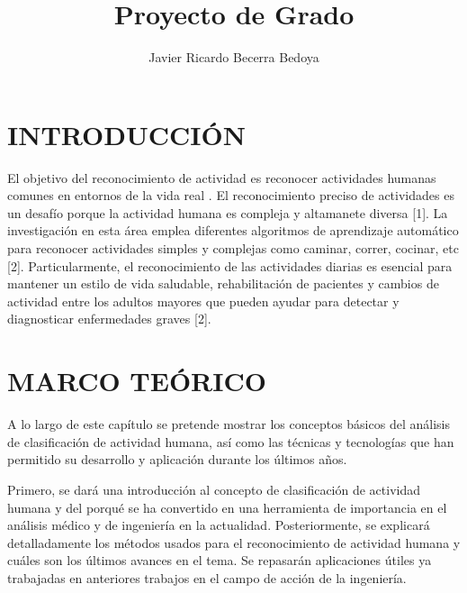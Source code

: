 \documentclass[11pt]{report} %
\title{Proyecto de Grado}
\author{Javier Ricardo Becerra Bedoya}
\begin{document}
\maketitle

\chapter{INTRODUCCIÓN}
El objetivo del reconocimiento de actividad es reconocer actividades humanas comunes en entornos de la vida real \cite{kimHAR}. El reconocimiento preciso de actividades es un desafío porque la actividad humana es compleja y altamanete diversa [1]. La investigación en esta área emplea diferentes algoritmos de aprendizaje automático para reconocer actividades simples y complejas como caminar, correr, cocinar, etc [2]. Particularmente, el reconocimiento de las actividades diarias es esencial para mantener un estilo de vida saludable, rehabilitación de pacientes y cambios de actividad entre los adultos mayores que pueden ayudar para detectar y diagnosticar enfermedades graves [2].
\chapter{MARCO TEÓRICO}
A lo largo de este capítulo se pretende mostrar los conceptos básicos del análisis de clasificación de actividad humana,
así como las técnicas y tecnologías que han permitido su desarrollo y aplicación durante los últimos años.
\par
\medskip
\noindent
Primero, se dará una introducción al concepto de clasificación de actividad humana y del porqué se ha convertido en una herramienta
de importancia en el análisis médico y de ingeniería en la actualidad. Posteriormente, se explicará detalladamente los métodos usados para el reconocimiento de actividad humana y cuáles son los últimos avances en el tema. Se repasarán aplicaciones útiles ya trabajadas en anteriores trabajos en el campo de acción de la ingeniería.
\end{document}
